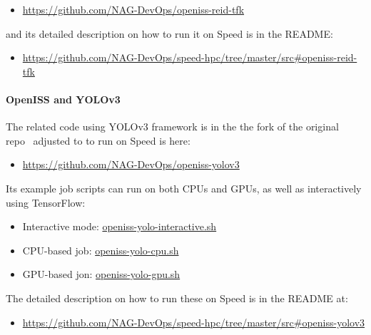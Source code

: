 \begin{itemize}
	\item \url{https://github.com/NAG-DevOps/openiss-reid-tfk}
\end{itemize}

and its detailed description on how to run it on Speed is
in the README:

\begin{itemize}
	\item \url{https://github.com/NAG-DevOps/speed-hpc/tree/master/src#openiss-reid-tfk}
\end{itemize}

\paragraph{OpenISS and YOLOv3}
\label{sect:openiss-yolov3}

The related code using YOLOv3 framework is in the
the fork of the original repo~\cite{openiss-yolov3} adjusted
to to run on Speed is here:

\begin{itemize}
	\item \url{https://github.com/NAG-DevOps/openiss-yolov3}
\end{itemize}

Its example job scripts can run on both CPUs and GPUs,
as well as interactively using TensorFlow:

\begin{itemize}
	\item Interactive mode:
  \href{https://github.com/NAG-DevOps/speed-hpc/blob/master/src/openiss-yolo-interactive.sh}
  {openiss-yolo-interactive.sh}
	\item CPU-based job:
  \href{https://github.com/NAG-DevOps/speed-hpc/blob/master/src/openiss-yolo-cpu.sh}
  {openiss-yolo-cpu.sh}
	\item GPU-based jon:
  \href{https://github.com/NAG-DevOps/speed-hpc/blob/master/src/openiss-yolo-gpu.sh}
  {openiss-yolo-gpu.sh}
\end{itemize}

The detailed description on how to run these on Speed is
in the README at:

\begin{itemize}
	\item \url{https://github.com/NAG-DevOps/speed-hpc/tree/master/src#openiss-yolov3}
\end{itemize}

